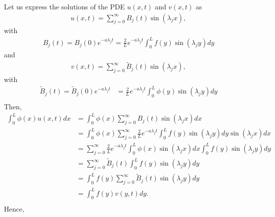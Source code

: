 \begin{questions}

\begin{solution}
Let us express the solutions of the PDE $u(x,t)$ and $v(x,t)$ as
\begin{align*}
u(x,t)=\sum_{j=0}^{\infty}B_j(t)\sin(\lambda_jx),
\end{align*}
with
\begin{align*}
B_j(t)=B_j(0)e^{-a\lambda_jt}=\frac{2}{L}e^{-a\lambda_jt}\int_0^Lf(y)\sin(\lambda_jy)dy 
\end{align*}
and
\begin{align*}
v(x,t)=\sum_{j=0}^{\infty}\tilde{B}_j(t)\sin(\lambda_jx),
\end{align*}
with
\begin{align*}
\tilde{B}_j(t)=\tilde{B}_j(0)e^{-a\lambda_jt}&=\frac{2}{L}e^{-a\lambda_jt}\int_0^L\phi(y)\sin(\lambda_jy)dy\\
\end{align*}
Then,
\begin{align*}
\int_0^L\phi(x)u(x,t)dx&=\int_0^L\phi(x)\sum_{j=0}^{\infty}B_j(t)\sin(\lambda_jx)dx\\
&=\int_0^L\phi(x)\sum_{j=0}^{\infty}\frac{2}{L}e^{-a\lambda_jt}\int_0^Lf(y)\sin(\lambda_jy)dy\sin(\lambda_jx)dx\\
&=\sum_{j=0}^{\infty}\frac{2}{L}e^{-a\lambda_jt}\int_0^L\phi(x)\sin(\lambda_jx)dx\int_0^Lf(y)\sin(\lambda_jy)dy\\
&=\sum_{j=0}^{\infty}\tilde{B}_j(t)\int_0^Lf(y)\sin(\lambda_jy)dy\\
&=\int_0^Lf(y)\sum_{j=0}^{\infty}\tilde{B}_j(t)\sin(\lambda_jy)dy\\
&=\int_0^Lf(y)v(y,t)dy.\\
\end{align*}
Hence,
\begin{align*}

\end{align*}
\end{solution}
\end{questions}

